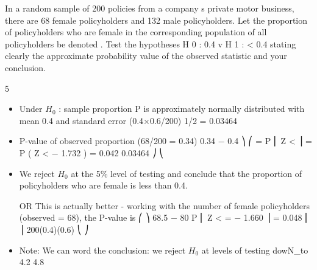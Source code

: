 \documentclass[a4paper,12pt]{article}
\begin{document}
In a random sample of 200 policies from a company s private motor business, there
are 68 female policyholders and 132 male policyholders.
Let the proportion of policyholders who are female in the corresponding population of
all policyholders be denoted .
Test the hypotheses
H 0 :
0.4 v H 1 :
< 0.4
stating clearly the approximate probability value of the observed statistic and your conclusion.
%


\newpage

5
\begin{itemize}
    \item Under $H_0$ : sample proportion P is approximately normally distributed with mean 0.4
and standard error (0.4×0.6/200) 1/2 = 0.03464
\item P-value of observed proportion (68/200 = 0.34)
0.34 − 0.4 ⎞
⎛
= P ⎜ Z <
⎟ = P ( Z < − 1.732 ) = 0.042
0.03464 ⎠
⎝
\item We reject $H_0$ at the 5\% level of testing and conclude that the proportion of policyholders who are female is less than 0.4.
\item [OR This is actually better - working with the number of female policyholders (observed = 68), the P-value is
⎛
⎞
68.5 − 80
P ⎜ Z <
= − 1.660 ⎟ = 0.048
⎜
⎟
200(0.4)(0.6)
⎝
⎠
]
\item Note: We can word the conclusion: we reject $H_0$ at levels of testing dowN_to 4.2%
4.8%
\end{itemize}


\end{document}
